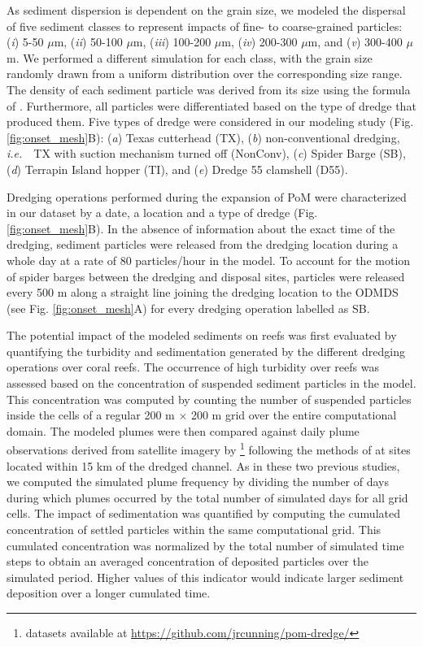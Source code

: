 \documentclass[preprint,12pt,authoryear]{elsarticle}
\newcommand{\ie}{{\it i.e.}\ }
\begin{document}
As sediment dispersion is dependent on the grain size, we modeled the dispersal of five sediment classes to represent impacts of fine- to coarse-grained particles: (\textit{i}) 5-50 $\mu$m, (\textit{ii}) 50-100 $\mu$m, (\textit{iii}) 100-200 $\mu$m, (\textit{iv}) 200-300 $\mu$m, and (\textit{v}) 300-400 $\mu$m. We performed a  different simulation for each class, with the grain size randomly drawn from a uniform distribution over the corresponding size range. The density of each sediment particle was derived from its size using the formula of \cite{hamilton1982sound}. Furthermore, all particles were differentiated based on the type of dredge that produced them. Five types of dredge were considered in our modeling study (Fig. \ref{fig:onset_mesh}B): (\textit{a}) Texas cutterhead (TX), (\textit{b}) non-conventional dredging, \ie~TX with suction mechanism turned off (NonConv), (\textit{c}) Spider Barge (SB), (\textit{d}) Terrapin Island hopper (TI), and (\textit{e}) Dredge 55 clamshell (D55).

Dredging operations performed during the expansion of PoM were characterized in our dataset by a date, a location and  a type of dredge (Fig. \ref{fig:onset_mesh}B). In the absence of information about the exact time of the dredging, sediment particles were released from the dredging location during a whole day at a rate of 80 particles/hour in the model. To account for the motion of spider barges between the dredging and disposal sites, particles were released every 500 m along a straight line joining the dredging location to the ODMDS (see Fig. \ref{fig:onset_mesh}A) for every dredging operation labelled as SB.

The potential impact of the modeled sediments on reefs was first evaluated by quantifying the turbidity and sedimentation generated by the different dredging operations over coral reefs. The occurrence of high turbidity over reefs was assessed based on the concentration of suspended sediment particles in the model. This concentration was computed by counting the number of suspended particles inside the cells of a regular 200 m $\times$ 200 m grid over the entire computational domain. The modeled plumes were then compared against daily plume observations derived from satellite imagery by \cite{cunning2019extensive}\footnote{datasets available at \url{https://github.com/jrcunning/pom-dredge/}} following the methods of \cite{barnes2015sediment} at sites located within 15 km of the dredged channel. As in these two previous studies, we computed  the simulated plume frequency by dividing the number of days during which plumes occurred by the total number of simulated days for all grid cells. The impact of sedimentation was quantified by computing the cumulated concentration of settled particles within the same computational grid. This cumulated concentration was normalized by the total number of simulated time steps to obtain an averaged concentration of deposited particles over the simulated period. Higher values of this indicator would indicate larger sediment deposition over a longer cumulated time.
\end{document}

